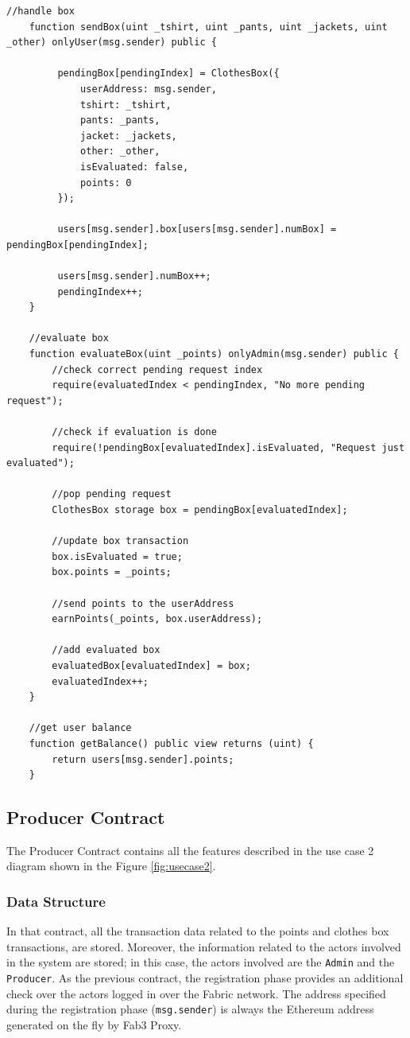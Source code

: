 \begin{lstlisting}[language=Solidity]
    //handle box
    function sendBox(uint _tshirt, uint _pants, uint _jackets, uint _other) onlyUser(msg.sender) public {

         pendingBox[pendingIndex] = ClothesBox({
             userAddress: msg.sender,
             tshirt: _tshirt,
             pants: _pants,
             jacket: _jackets,
             other: _other,
             isEvaluated: false,
             points: 0
         });

         users[msg.sender].box[users[msg.sender].numBox] = pendingBox[pendingIndex];

         users[msg.sender].numBox++;
         pendingIndex++;
    }

    //evaluate box
    function evaluateBox(uint _points) onlyAdmin(msg.sender) public {
        //check correct pending request index
        require(evaluatedIndex < pendingIndex, "No more pending request");

        //check if evaluation is done
        require(!pendingBox[evaluatedIndex].isEvaluated, "Request just evaluated");

        //pop pending request
        ClothesBox storage box = pendingBox[evaluatedIndex];

        //update box transaction
        box.isEvaluated = true;
        box.points = _points;

        //send points to the userAddress
        earnPoints(_points, box.userAddress);

        //add evaluated box
        evaluatedBox[evaluatedIndex] = box;
        evaluatedIndex++;
    }

    //get user balance
    function getBalance() public view returns (uint) {
        return users[msg.sender].points;
    }
\end{lstlisting}

\subsection{Producer Contract}

The Producer Contract contains all the features described in the use case 2 diagram shown in 
the Figure \ref{fig:usecase2}.

\subsubsection{Data Structure}

In that contract, all the transaction data related to the points and clothes box transactions, are stored. Moreover, 
the information related to the actors involved in the system are stored; in this case, the actors involved are 
the \texttt{Admin} and the \texttt{Producer}.
As the previous contract, the registration phase provides an additional check over the actors logged in over the 
Fabric network. The address specified during the registration phase (\texttt{msg.sender}) is always the Ethereum 
address generated on the fly by Fab3 Proxy.
\bigskip

